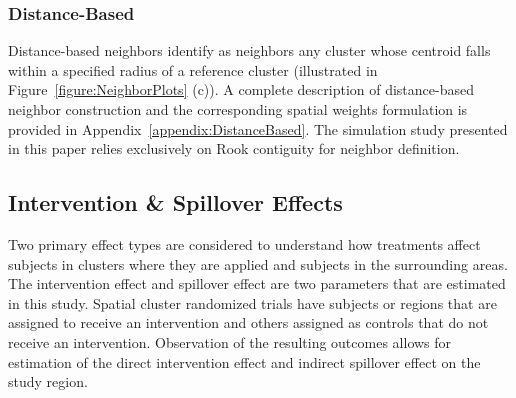 \documentclass{article}[11pt]
\begin{document}



\subsubsection{Distance-Based}

Distance-based neighbors\cite{fotheringham_sage_2009} identify as neighbors any cluster whose centroid falls within a specified radius of a reference cluster (illustrated in Figure~\ref{figure:NeighborPlots} (c)). A complete description of distance-based neighbor construction and the corresponding spatial weights formulation is provided in Appendix~\ref{appendix:DistanceBased}. The simulation study presented in this paper relies exclusively on Rook contiguity for neighbor definition.

\subsection{Intervention \& Spillover Effects}

Two primary effect types are considered to understand how treatments affect subjects in clusters where they are applied and subjects in the surrounding areas. The intervention effect and spillover effect are two parameters that are estimated in this study. Spatial cluster randomized trials have subjects or regions that are assigned to receive an intervention and others assigned as controls that do not receive an intervention. Observation of the resulting outcomes allows for estimation of the direct intervention effect and indirect spillover effect on the study region.
\end{document}

